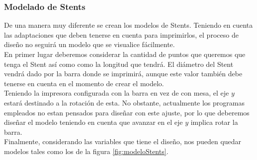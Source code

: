 \documentclass[a4paper,12pt]{article}
\begin{document}
\subsubsection{Modelado de Stents}
De una manera muy diferente se crean los modelos de Stents. Teniendo en cuenta las adaptaciones que deben tenerse en cuenta para imprimirlos, el proceso de diseño no seguirá un modelo que se visualice fácilmente.\\

En primer lugar deberemos considerar la cantidad de puntos que queremos que tenga el Stent así como como la longitud que tendrá. El diámetro del Stent vendrá dado por la barra donde se imprimirá, aunque este valor también debe tenerse en cuenta en el momento de crear el modelo.\\

Teniendo la impresora configurada con la barra en vez de con mesa, el eje $y$ estará destinado a la rotación de esta. No obstante, actualmente los programas empleados no estan pensados para diseñar con este ajuste, por lo que deberemos diseñar el modelo teniendo en cuenta que avanzar en el eje $y$ implica rotar la barra.\\

Finalmente, considerando las variables que tiene el diseño, nos pueden quedar modelos tales como los de la figura \ref{fig:modeloStents}.
\end{document}
